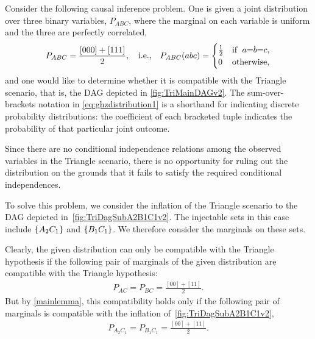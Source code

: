 Consider the following causal inference problem.  One is given a joint distribution over three binary variables, $P_{A B C}$, where the marginal on each variable is uniform and the three are perfectly correlated,
\begin{align}\label{eq:ghzdistribution1}
P_{A B C} =\frac{[000]+[111]}{2},\quad\text{i.e.,}\quad P_{A B C}(a b c)=\begin{cases}\tfrac{1}{2}&\text{if }\; a\mathord{=} b\mathord{=} c, \\ 0&\text{otherwise},\end{cases}
\end{align}
and one would like to determine whether it is compatible with the Triangle scenario, that is, the DAG depicted in \cref{fig:TriMainDAGv2}.  The sum-over-brackets notation in \cref{eq:ghzdistribution1} is a shorthand for indicating discrete probability distributions: the coefficient of each bracketed tuple indicates the probability of that particular joint outcome.

Since there are no conditional independence relations among the observed variables in the Triangle scenario, there is no opportunity for ruling out the distribution on the grounds that it fails to satisfy the required conditional independences. 


To solve this problem, we consider the inflation of the Triangle scenario to the DAG depicted in~\cref{fig:TriDagSubA2B1C1v2}.  
The injectable sets in this case include $\left\lbrace A_2 C_1\right\rbrace$ and $\left\lbrace B_1 C_1\right\rbrace$.  We therefore consider the marginals on these sets.

Clearly, the given distribution can only be compatible with the Triangle hypothesis if the following pair of marginals of the given distribution are compatible with the Triangle hypothesis:
\begin{align*}
P_{A C} = P_{B C} = \frac{[00]+[11]}{2}.
\end{align*}
But by \cref{mainlemma}, this compatibility holds only if the following pair of marginals is compatible with the inflation of~\cref{fig:TriDagSubA2B1C1v2},
\begin{align*}
P_{A_2 C_1} = P_{B_1 C_1} = \frac{[00]+[11]}{2}.
\end{align*}

